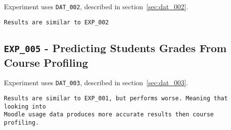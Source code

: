 Experiment uses \texttt{DAT\_002}, described in section~\ref{sec:dat_002}.

\begin{verbatim}
Results are similar to EXP_002
\end{verbatim}

\subsection{\texttt{EXP\_005} - Predicting Students Grades From Course
Profiling}

Experiment uses \texttt{DAT\_003}, described in section~\ref{sec:dat_003}.

\begin{verbatim}
Results are similar to EXP_001, but performs worse. Meaning that looking into
Moodle usage data produces more accurate results then course profiling.
\end{verbatim}

